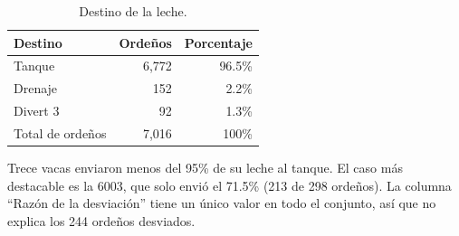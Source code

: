 \begin{table}[H]
  \centering
  \caption{Destino de la leche.}
  \label{tab:destino}
  \begin{tabular}{lrr}
    \toprule
    Destino & Ordeños & Porcentaje \\
    \midrule
    Tanque & 6,772 & 96.5\% \\
    Drenaje & 152 & 2.2\% \\
    Divert 3 & 92 & 1.3\% \\
    Total de ordeños & 7,016 & 100\% \\
    \bottomrule
  \end{tabular}
\end{table}

Trece vacas enviaron menos del 95\% de su leche al tanque. El caso más destacable es la 6003, que solo envió el 71.5\% (213 de 298 ordeños). La columna ``Razón de la desviación'' tiene un único valor en todo el conjunto, así que no explica los 244 ordeños desviados.
